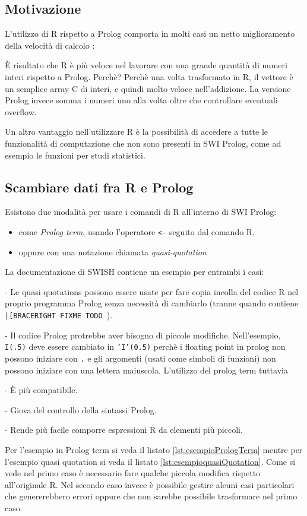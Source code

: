 \documentclass[10pt,titlepage,twoside,a4paper]{report}
\begin{document}
        \subsection{Motivazione}
L'utilizzo di R rispetto a Prolog comporta in molti casi un netto miglioramento 
della velocità di calcolo \cite{rFaster}:
\begin{displayquote}
[..] È risultato che R è più veloce nel lavorare con una grande quantità
di numeri interi rispetto a Prolog. Perchè? Perchè una volta trasformato in R,
il vettore è un semplice array C di interi, e quindi molto veloce 
nell'addizione. La versione Prolog invece somma i numeri uno alla volta
oltre che controllare eventuali overflow.
\end{displayquote}

Un altro vantaggio nell'utilizzare R è la possibilità di accedere a tutte le 
funzionalità di computazione che non sono presenti in SWI Prolog, come ad 
esempio le funzioni per studi statistici.
 
\subsection{Scambiare dati fra R e Prolog}
Esistono due modalità per usare i comandi di R all'interno di SWI Prolog:
\begin{itemize}
    \item come \emph{Prolog term}, usando l'operatore \texttt{<-} 
seguito dal comando R,
    \item oppure con una notazione chiamata \emph{quasi-quotation}
\end{itemize}
La documentazione di SWISH contiene un esempio per entrambi i 
casi\cite{rprolognotations}:
\begin{displayquote}
- Le quasi quotations possono essere usate per fare copia incolla del codice R 
nel proprio programma Prolog senza necessità di cambiarlo (tranne quando 
contiene \texttt{|[BRACERIGHT FIXME TODO }).

- Il codice Prolog protrebbe aver bisogno di piccole modifiche. Nell'esempio,
  \texttt{I(.5)} deve essere cambiato in \texttt{'I'(0.5)} perchè 
  i floating point in prolog non possono iniziare con \texttt{.} e gli 
  argomenti (usati come simboli di funzioni) non possono iniziare con una lettera 
  maiuscola. L'utilizzo del prolog term tuttavia

    - È più compatibile.

    - Giova del controllo della sintassi Prolog.

    - Rende più facile comporre espressioni R da elementi più piccoli.
\end{displayquote}
Per l'esempio in Prolog term si veda il listato \ref{lst:esempioPrologTerm}
mentre per l'esempio quasi quotation si veda il 
listato \ref{lst:esempioquasiQuotation}.
Come si vede nel primo caso è necessario fare qualche piccola modifica 
rispetto all'originale R. Nel secondo caso invece è possibile gestire alcuni 
casi particolari che genererebbero errori oppure che non sarebbe possibile 
trasformare nel primo caso.
\end{document}

